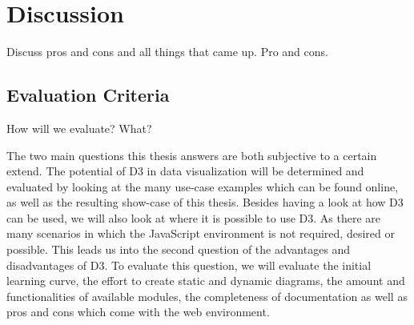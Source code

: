 \chapter{Discussion}
Discuss pros and cons and all things that came up. Pro and cons. 


\section{Evaluation Criteria}
How will we evaluate? What?

The two main questions this thesis answers are both subjective to a certain extend. The potential of D3 in data visualization will be determined and evaluated by looking at the many use-case examples which can be found online, as well as the resulting show-case of this thesis. Besides having a look at how D3 can be used, we will also look at where it is possible to use D3. As there are many scenarios in which the JavaScript environment is not required, desired or possible. This leads us into the second question of the advantages and disadvantages of D3. To evaluate this question, we will evaluate the initial learning curve, the effort to create static and dynamic diagrams, the amount and functionalities of available modules, the completeness of documentation as well as pros and cons which come with the web environment.
